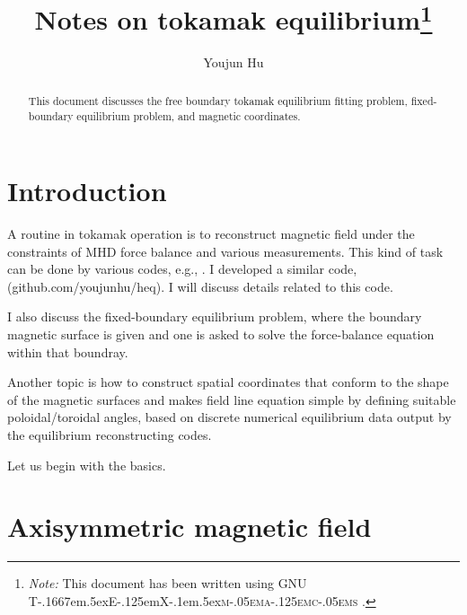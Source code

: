 \documentclass{llncs}
\newcommand{\TeXmacs}{T\kern-.1667em\lower.5ex\hbox{E}\kern-.125emX\kern-.1em\lower.5ex\hbox{\textsc{m\kern-.05ema\kern-.125emc\kern-.05ems}}}
\newcommand{\citetexmacs}[1]{This document has been written using GNU {\TeXmacs} \cite{#1}.}
\newcommand{\tmnote}[1]{\thanks{\textit{Note:} #1}}
\newcommand{\tmtexttt}[1]{\text{{\ttfamily{#1}}}}
\begin{document}
\title{Notes on tokamak equilibrium\tmnote{{\citetexmacs{TeXmacs:website}}}}

\author{Youjun Hu}


\maketitle

\begin{abstract}
  This document discusses the free boundary tokamak equilibrium fitting
  problem, fixed-boundary equilibrium problem, and magnetic coordinates.
\end{abstract}

\section{Introduction}

A routine in tokamak operation is to reconstruct magnetic field under the
constraints of MHD force balance and various measurements. This kind of task
can be done by various codes, e.g., \tmtexttt{EFIT}. I developed a similar
code, \tmtexttt{heq} (github.com/youjunhu/heq). I will discuss details related
to this code.

I also discuss the fixed-boundary equilibrium problem, where the boundary
magnetic surface is given and one is asked to solve the force-balance equation
within that boundray.

Another topic is how to construct spatial coordinates that conform to the
shape of the magnetic surfaces and makes field line equation simple by
defining suitable poloidal/toroidal angles, based on discrete numerical
equilibrium data output by the equilibrium reconstructing codes.

Let us begin with the basics.

\section{ Axisymmetric magnetic field}\label{5-13-1s}
\end{document}
